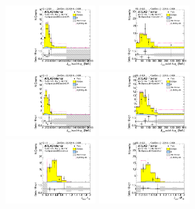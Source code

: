 \begin{figure}[htbp!]
\begin{center}
\includegraphics[width=0.31\textwidth,angle=-90]{figures/boosted/Signal/b77_FourTag_Signal_leadHCand_trk0_Pt.pdf}
\includegraphics[width=0.31\textwidth,angle=-90]{figures/boosted/Signal/b77_FourTag_Signal_leadHCand_trk1_Pt.pdf}\\
\includegraphics[width=0.31\textwidth,angle=-90]{figures/boosted/Signal/b77_FourTag_Signal_sublHCand_trk0_Pt.pdf}
\includegraphics[width=0.31\textwidth,angle=-90]{figures/boosted/Signal/b77_FourTag_Signal_sublHCand_trk1_Pt.pdf}\\
\includegraphics[width=0.31\textwidth,angle=-90]{figures/boosted/Signal/b77_FourTag_Signal_leadHCand_trk_dr.pdf}
\includegraphics[width=0.31\textwidth,angle=-90]{figures/boosted/Signal/b77_FourTag_Signal_sublHCand_trk_dr.pdf}

\end{center}
\end{figure}
